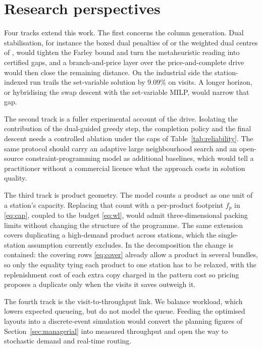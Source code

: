 \documentclass[]{interact}
\begin{document}
\section{Research perspectives}\label{sec:perspectives}
Four tracks extend this work. The first concerns the column generation. Dual stabilisation, for instance the boxed dual penalties of \citet{dumerle1999stabilized} or the weighted dual centres of \citet{wentges1997weighted}, would tighten the Farley bound and turn the metaheuristic reading into certified gaps, and a branch-and-price layer over the price-and-complete drive would then close the remaining distance. On the industrial side the station-indexed run trails the set-variable solution by 9.09\% on visits. A longer horizon, or hybridising the swap descent with the set-variable MILP, would narrow that gap.

The second track is a fuller experimental account of the drive. Isolating the contribution of the dual-guided greedy step, the completion policy and the final descent needs a controlled ablation under the caps of Table~\ref{tab:reliability}. The same protocol should carry an adaptive large neighbourhood search and an open-source constraint-programming model \citep{ropke2006alns, perron2023cpsat} as additional baselines, which would tell a practitioner without a commercial licence what the approach costs in solution quality.

The third track is product geometry. The model counts a product as one unit of a station's capacity. Replacing that count with a per-product footprint $f_p$ in \eqref{eq:cap}, coupled to the budget \eqref{eq:wl}, would admit three-dimensional packing limits without changing the structure of the programme. The same extension covers duplicating a high-demand product across stations, which the single-station assumption currently excludes. In the decomposition the change is contained: the covering rows \eqref{eq:cover} already allow a product in several bundles, so only the equality tying each product to one station has to be relaxed, with the replenishment cost of each extra copy charged in the pattern cost so pricing proposes a duplicate only when the visits it saves outweigh it.

The fourth track is the visit-to-throughput link. We balance workload, which lowers expected queueing, but do not model the queue. Feeding the optimised layouts into a discrete-event simulation would convert the planning figures of Section~\ref{sec:managerial} into measured throughput and open the way to stochastic demand and real-time routing.
\end{document}
